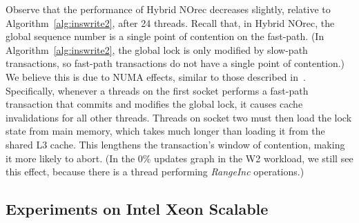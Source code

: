 Observe that the performance of Hybrid NOrec decreases slightly, relative to Algorithm~\ref{alg:inswrite2}, after 24 threads.
Recall that, in Hybrid NOrec, the global sequence number is a single point of contention on the fast-path.
(In Algorithm~\ref{alg:inswrite2}, the global lock is only modified by slow-path transactions, so fast-path transactions do not have a single point of contention.)
We believe this is due to NUMA effects, similar to those described in~\cite{BKLL16}.
Specifically, whenever a threads on the first socket performs a fast-path transaction that commits and modifies the global lock, it causes cache invalidations for all other threads.
Threads on socket two must then load the lock state from main memory, which takes much longer than loading it from the shared L3 cache.
This lengthens the transaction's window of contention, making it more likely to abort.
(In the 0\% updates graph in the W2 workload, we still see this effect, because there is a thread performing \textit{RangeInc} operations.)

\subsection{Experiments on Intel Xeon Scalable}

